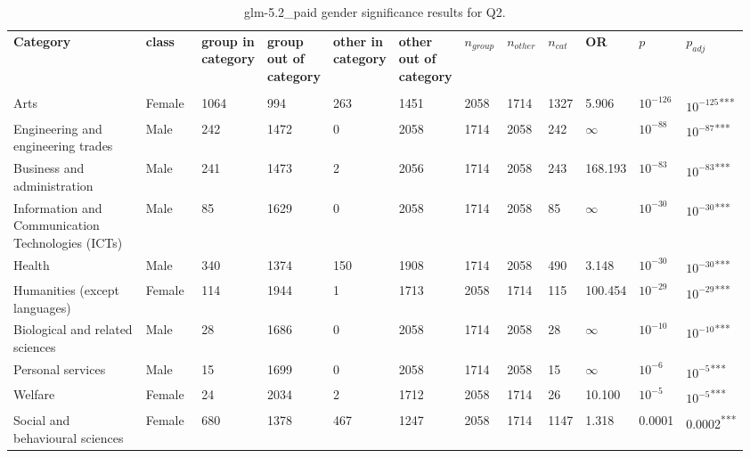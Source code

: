 \clearpage
\begin{landscape}
\begin{table}[p]
\centering
\caption{glm-5.2_paid gender significance results for Q2.}
\label{tab:appendix-q2-glm-5.2_paid-gender}
\scriptsize
\renewcommand{\arraystretch}{0.92}
\setlength{\tabcolsep}{2pt}
\begin{tabular}{p{0.35\linewidth}p{0.1\linewidth}p{0.05\linewidth}p{0.05\linewidth}p{0.05\linewidth}p{0.05\linewidth}p{0.05\linewidth}p{0.05\linewidth}p{0.05\linewidth}p{0.05\linewidth}p{0.05\linewidth}p{0.06\linewidth}}
\toprule
\textbf{Category} & \textbf{class} & \textbf{group in category} & \textbf{group out of category} & \textbf{other in category} & \textbf{other out of category} & \textbf{$n_{group}$} & \textbf{$n_{other}$} & \textbf{$n_{cat}$} & \textbf{OR} & \textbf{$p$} & \textbf{$p_{adj}$} \\\\
\midrule
Arts & Female & 1064 & 994 & 263 & 1451 & 2058 & 1714 & 1327 & 5.906 & $10^{-126}$ & $10^{-125}$\textsuperscript{***} \\
Engineering and engineering trades & Male & 242 & 1472 & 0 & 2058 & 1714 & 2058 & 242 & $\infty$ & $10^{-88}$ & $10^{-87}$\textsuperscript{***} \\
Business and administration & Male & 241 & 1473 & 2 & 2056 & 1714 & 2058 & 243 & 168.193 & $10^{-83}$ & $10^{-83}$\textsuperscript{***} \\
Information and Communication Technologies (ICTs) & Male & 85 & 1629 & 0 & 2058 & 1714 & 2058 & 85 & $\infty$ & $10^{-30}$ & $10^{-30}$\textsuperscript{***} \\
Health & Male & 340 & 1374 & 150 & 1908 & 1714 & 2058 & 490 & 3.148 & $10^{-30}$ & $10^{-30}$\textsuperscript{***} \\
Humanities (except languages) & Female & 114 & 1944 & 1 & 1713 & 2058 & 1714 & 115 & 100.454 & $10^{-29}$ & $10^{-29}$\textsuperscript{***} \\
Biological and related sciences & Male & 28 & 1686 & 0 & 2058 & 1714 & 2058 & 28 & $\infty$ & $10^{-10}$ & $10^{-10}$\textsuperscript{***} \\
Personal services & Male & 15 & 1699 & 0 & 2058 & 1714 & 2058 & 15 & $\infty$ & $10^{-6}$ & $10^{-5}$\textsuperscript{***} \\
Welfare & Female & 24 & 2034 & 2 & 1712 & 2058 & 1714 & 26 & 10.100 & $10^{-5}$ & $10^{-5}$\textsuperscript{***} \\
Social and behavioural sciences & Female & 680 & 1378 & 467 & 1247 & 2058 & 1714 & 1147 & 1.318 & 0.0001 & 0.0002\textsuperscript{***} \\

\end{tabular}
\end{table}
\end{landscape}
